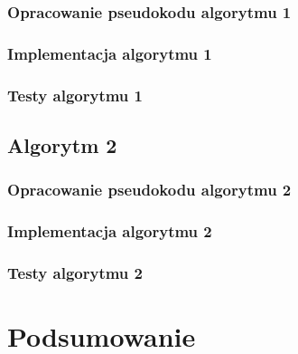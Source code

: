 \documentclass[a4paper]{article}
\begin{document}
\subsubsection{Opracowanie pseudokodu algorytmu 1}
\subsubsection{Implementacja algorytmu 1}
\subsubsection{Testy algorytmu 1}
\subsection{Algorytm 2}
\subsubsection{Opracowanie pseudokodu algorytmu 2}
\subsubsection{Implementacja algorytmu 2}
\subsubsection{Testy algorytmu 2}


\section{Podsumowanie}


\newpage
\printbibliography[heading=bibintoc]
\end{document}
